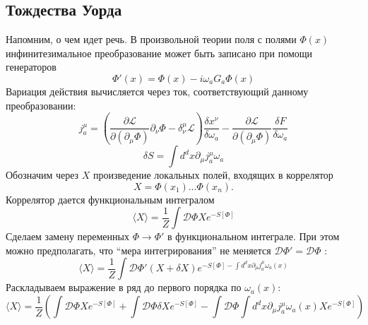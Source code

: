 \documentclass[a4paper,12pt]{article}
\theoremstyle{definition}
\theoremstyle{definition}
\theoremstyle{definition}
\begin{document}
\subsection{Тождества Уорда}
\label{sec:ward-identities}

Напомним, о чем идет речь. В произвольной теории поля с полями $\Phi(x)$ инфинитезимальное преобразование может быть записано при помощи генераторов
\begin{equation}
  \label{eq:198}
  \Phi'(x)=\Phi(x)-i\omega_{a} G_{a} \Phi(x)
\end{equation}
Вариация действия вычисляется через ток, соответствующий данному преобразовании:
\begin{equation}
  \label{eq:199}
  j^{\mu}_{a}=\left(\frac{\partial \mathcal{L} }{\partial (\partial_{\mu}\Phi)} \partial_{\nu}\Phi -\delta^{\mu}_{\nu}\mathcal{L}\right) \frac{\delta x^{\nu}}{\delta \omega_{a}} - \frac{\partial \mathcal{L} }{\partial (\partial_{\mu} \Phi)}\frac{\delta F}{\delta \omega_{a}}
\end{equation}
\begin{equation}
  \label{eq:200}
  \delta S =\int d^{d}x \partial_{\mu}j^{\mu}_{a} \omega_{a}
\end{equation}
Обозначим через $X$ произведение локальных полей, входящих в коррелятор
\begin{equation}
  \label{eq:201}
  X=\Phi(x_{1})\dots \Phi(x_{n}).
\end{equation}
Коррелятор дается функциональным интегралом
\begin{equation}
  \label{eq:202}
  \langle X\rangle = \frac{1}{Z}\int \mathcal{D} \Phi X e^{-S[\Phi]}
\end{equation}
Сделаем замену переменных $\Phi\to \Phi'$ в функциональном интеграле. При этом можно предполагать, что ``мера интегрирования'' не меняется $\mathcal{D}\Phi'=\mathcal{D}\Phi$ \cite{difrancesco1997cft}:
\begin{equation}
  \label{eq:203}
  \langle X\rangle = \frac{1}{Z} \int \mathcal{D} \Phi' (X+\delta X)e^{-S[\Phi]-\int d^{d}x \partial_{\mu}j^{\mu}_{a}\omega_{a}(x)}
\end{equation}
Раскладываем выражение в ряд до первого порядка по $\omega_{a}(x)$:
\begin{equation}
  \label{eq:204}
  \langle X\rangle=\frac{1}{Z} \left( \int \mathcal{D} \Phi X e^{-S[\Phi]}+\int \mathcal{D} \Phi \delta X e^{-S[\Phi]} -\int \mathcal{D}\Phi \int d^{d}x \partial_{\mu}j^{\mu}_{a}\omega_{a}(x) X e^{-S[\Phi]}\right)
\end{equation}
\end{document}
